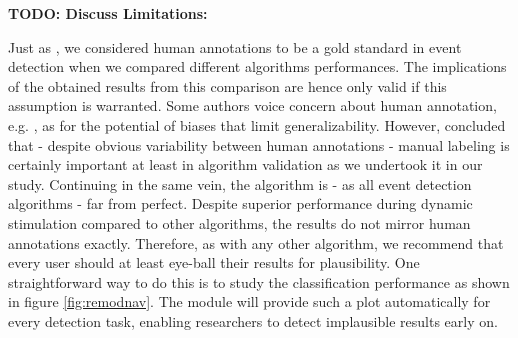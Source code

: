 \textbf{TODO: Discuss Limitations:}

Just as \cite{Andersson2017}, we considered human annotations to be a gold standard in event detection when we compared different algorithms performances. The implications of the obtained results from this comparison are hence only valid if this assumption is warranted. Some authors voice concern about human annotation, e.g. \cite{5523936}, as for the potential of biases that limit generalizability. However, \cite{Hooge2018} concluded that - despite obvious variability between human annotations - manual labeling is certainly important at least in algorithm validation as we undertook it in our study. Continuing in the same vein, the \remodnav algorithm is - as all event detection algorithms - far from perfect. Despite superior performance during dynamic stimulation compared to other algorithms, the results do not mirror human annotations exactly. Therefore, as with any other algorithm, we recommend that every user should at least eye-ball their results for plausibility. One straightforward way to do this is to study the classification performance as shown in figure \ref{fig:remodnav}. The \remodnav module will provide such a plot automatically for every detection task, enabling researchers to detect implausible results early on. \\



